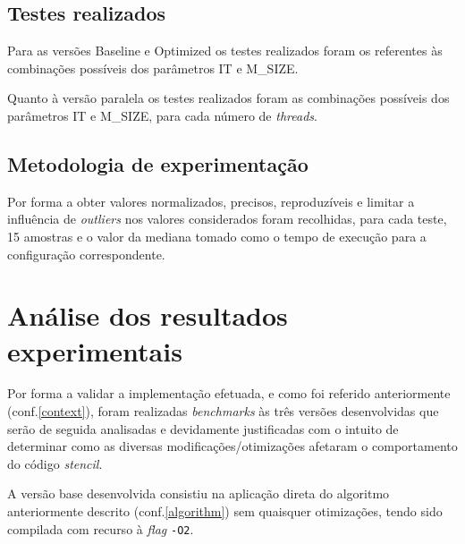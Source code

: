\documentclass{article}
\begin{document}
\subsection{Testes realizados}
Para as versões Baseline e Optimized os testes realizados foram os referentes às combinações possíveis dos parâmetros IT e M\_SIZE.

Quanto à versão paralela os testes realizados foram as combinações possíveis dos parâmetros IT e M\_SIZE, para cada número de \textit{threads}.

\subsection{Metodologia de experimentação}
Por forma a obter valores normalizados, precisos, reproduzíveis e limitar a influência de \textit{outliers} nos valores considerados foram
recolhidas, para cada teste, 15 amostras e o valor da mediana tomado como o tempo de execução para a configuração 
correspondente.

\section{Análise dos resultados experimentais} \label{comp}
Por forma a validar a implementação efetuada, e como foi referido anteriormente (conf.\ref{context}), foram realizadas \textit{benchmarks} às três versões desenvolvidas que
serão de seguida analisadas e devidamente justificadas com o intuito de determinar como as diversas modificações/otimizações afetaram o comportamento do código 
\textit{stencil}.

A versão base desenvolvida consistiu na aplicação direta do algoritmo anteriormente descrito (conf.\ref{algorithm}) sem quaisquer otimizações, tendo sido compilada com 
recurso à \textit{flag} \texttt{-O2}.
\end{document}
